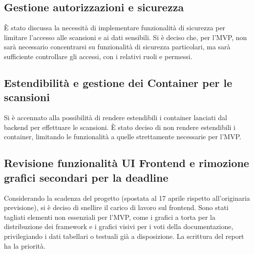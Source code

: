 \documentclass[a4paper, 11pt]{article}
\begin{document}
\subsection{Gestione autorizzazioni e sicurezza}
È stato discussa la necessità di implementare funzionalità di sicurezza per limitare l'accesso alle scansioni e ai dati sensibili. Si è deciso che, per l'MVP, non sarà necessario concentrarsi su funzionalità di sicurezza particolari, ma sarà  sufficiente controllare gli accessi, con i relativi ruoli e permessi.
\subsection{Estendibilità e gestione dei Container per le scansioni}
Si è accennato alla possibilità di rendere estendibili i container lanciati dal backend per effettuare le scansioni. È stato deciso di non rendere estendibili i container, limitando le funzionalità a quelle strettamente necessarie per l'MVP.

\subsection{Revisione funzionalità UI Frontend e rimozione grafici secondari per la deadline}
Considerando la scadenza del progetto (spostata al 17 aprile rispetto all'originaria previsione), si è deciso di snellire il carico di lavoro sul frontend. Sono stati tagliati elementi non essenziali per l'MVP, come i grafici a torta per la distribuzione dei framework e i grafici visivi per i voti della documentazione, privilegiando i dati tabellari o testuali già a disposizione. La scrittura del report ha la priorità.


\end{document}
